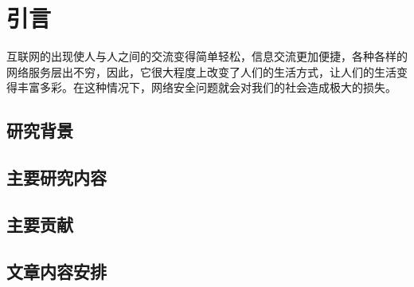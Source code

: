 \chapter{引言}
\label{cha:intro}
互联网的出现使人与人之间的交流变得简单轻松，信息交流更加便捷，各种各样的网络服务层出不穷，因此，它很大程度上改变了人们的生活方式，让人们的生活变得丰富多彩。在这种情况下，网络安全问题就会对我们的社会造成极大的损失。


\section{研究背景}
\label{sec:background}



\section{主要研究内容}
\label{sec:work}

\section{主要贡献}
\label{sec:contribution}

\section{文章内容安排}
\label{sec:contribution}

